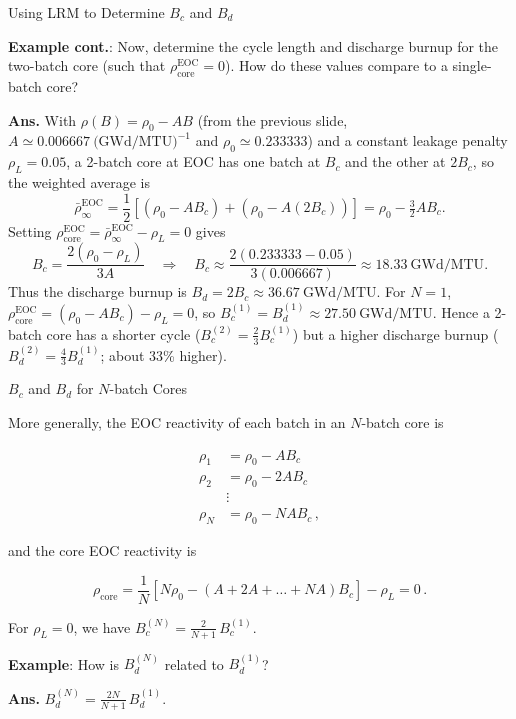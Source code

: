 \documentclass[aspectratio=1610]{beamer}
\begin{document}
\begin{frame}[fragile]{Using LRM to Determine $B_c$ and $B_d$}

{\bf Example cont.}: Now, determine the cycle length and discharge burnup for the two-batch core (such that $\rho_{\text{core}}^{\text{EOC}} = 0$).  How do these values compare to a single-batch core?

\vfill 

\pause 

\textcolor{wcprimary}{{\small {\bf Ans.}  
With $\rho(B)=\rho_0-AB$ (from the previous slide, $A\simeq 0.006667\ \text{(GWd/MTU)}^{-1}$ and $\rho_0\simeq 0.233333$) and a constant leakage penalty $\rho_L=0.05$, a 2-batch core at EOC has one batch at $B_c$ and the other at $2B_c$, so the weighted average is
\[
\bar{\rho}_\infty^{\text{EOC}}
=\frac{1}{2}\!\left[(\rho_0-AB_c)+(\rho_0-A(2B_c))\right]
=\rho_0-\tfrac{3}{2}AB_c.
\]
Setting $\rho_{\text{core}}^{\text{EOC}}=\bar{\rho}_\infty^{\text{EOC}}-\rho_L=0$ gives
\[
B_c=\frac{2(\rho_0-\rho_L)}{3A}
\quad\Rightarrow\quad
B_c\approx \frac{2(0.233333-0.05)}{3(0.006667)}
\approx \boxed{18.33\ \text{GWd/MTU}}.
\]
Thus the discharge burnup is $B_d=2B_c\approx \boxed{36.67\ \text{GWd/MTU}}$.
For $N=1$, $\rho_{\text{core}}^{\text{EOC}}=(\rho_0-AB_c)-\rho_L=0$,
so $B_c^{(1)} =  B_d^{(1)} \approx 27.50\ \text{GWd/MTU}$.
Hence a 2-batch core has a shorter cycle ($B_c^{(2)}=\tfrac{2}{3}B_c^{(1)}$) but a higher discharge burnup ($B_d^{(2)}=\tfrac{4}{3}B_d^{(1)}$; about 33\% higher).
}}
\end{frame}


\begin{frame}[fragile]{$B_c$ and $B_d$ for $N$-batch Cores}

More generally, the EOC reactivity of each batch in an $N$-batch core is

\begin{align*}
  \rho_1 &= \rho_0 -  AB_c \\
  \rho_2 &= \rho_0 - 2AB_c \\
         & \vdots \\
  \rho_N &= \rho_0 - NAB_c \, ,
\end{align*}

and the core EOC reactivity is 

\begin{equation*}
  \rho_{\text{core}} = \frac{1}{N} [ N\rho_0 - (A + 2A + \ldots + NA)B_c ] - \rho_L = 0 \, .
\end{equation*}

For $\rho_L = 0$, we have $B_c^{(N)} = \frac{2}{N+1}\,B_c^{(1)}$.

\vfill 
\pause 

{\bf Example}:  How is $B_d^{(N)}$ related to $B_d^{(1)}$?
\pause 

\textcolor{wcprimary}{{\small {\bf Ans.} $B_d^{(N)} = \frac{2N}{N+1}\,B_d^{(1)}$.}}


\end{frame}
 
\end{document}
